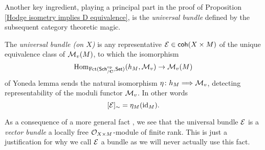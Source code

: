 Another key ingredient, playing a principal part in the proof of Proposition \ref{Hodge isometry implies D equivalence}, is the \emph{universal bundle} defined by the subsequent category theoretic magic.


\begin{definition}
    The \emph{universal bundle (on $X$)} is any representative $\mathcal E \in \mathsf{coh}(X \times M)$ of the unique equivalence class of $\mathcal M_v(M)$, to which the isomorphism 
    \[
        \operatorname{Hom}_{\operatorname{Fct(\mathsf{Sch}_{/\mathbf C}^{\text{op}}, \mathsf{Set})}}(h_M, \mathcal M_v) \to \mathcal M_v(M)
    \]
    of Yoneda lemma sends the natural isomorphism $\eta \colon h_M \Longrightarrow \mathcal M_v$, detecting representability of the moduli functor $\mathcal M_v$. In other words 
    \[
        [\mathcal E]_\sim = \eta_M(\operatorname{id}_{M}).
    \]
\end{definition}

\begin{remark}
    As a consequence of a more general fact \cite[\S 6.1, Remark 6.1.9]{HuybrechtsLehn2010}, we see that the universal bundle $\mathcal E$ is a \emph{vector bundle} \ie a locally free ${\mathcal{O}_{X \times M}}$-module of finite rank. This is just a justification for why we call $\mathcal E$ a bundle as we will never actually use this fact. 
\end{remark}


